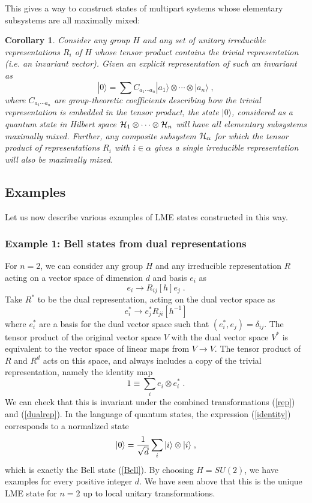 \documentclass[12pt]{article}
\newtheorem{corollary}[theorem]{Corollary}
\theoremstyle{definition}
\newcommand{\be}{\begin{equation}}
\newcommand{\ee}{\end{equation}}
\begin{document}
This gives a way to construct states of multipart systems whose elementary subsystems are all maximally mixed:
\begin{corollary}
Consider any group $H$ and any set of unitary irreducible representations $R_i$ of $H$ whose tensor product contains the trivial representation (i.e. an invariant vector). Given an explicit representation of such an invariant as
\be
\label{genstates}
|0 \rangle = \sum C_{a_1 \cdots a_n} |a_1 \rangle \otimes \cdots \otimes | a_n \rangle \; ,
\ee
where $C_{a_1 \cdots a_n}$ are group-theoretic coefficients describing how the trivial representation is embedded in the tensor product, the state $|0 \rangle$, considered as a quantum state in Hilbert space ${\cal H}_1 \otimes \cdots \otimes {\cal H}_n $ will have all elementary subsystems maximally mixed. Further, any composite subsystem ${\cal H}_{\alpha}$ for which the tensor product of representations $R_i$ with $i \in \alpha$ gives a single irreducible representation will also be maximally mixed.
\end{corollary}

\subsection{Examples}

Let us now describe various examples of LME states constructed in this way.

\subsubsection*{Example 1:  Bell states from dual representations}

For $n=2$, we can consider any group $H$ and any irreducible representation $R$ acting on a vector space of dimension $d$ and basis $e_i$ as
\be
\label{rep}
e_i \to R_{ij}[h] e_j \; .
\ee
Take $R^*$ to be the dual representation, acting on the dual vector space as
\be
\label{dualrep}
e^*_i \to  e^*_j R_{ji}[h^{-1}]
\ee
where $e^*_i$ are a basis for the dual vector space such that $(e^*_i, e_j) = \delta_{ij}$. The tensor product of the original vector space $V$ with the dual vector space $V^*$ is equivalent to the vector space of linear maps from $V \to V$. The tensor product of $R$ and $R^d$ acts on this space, and always includes a copy of the trivial representation, namely the identity map
\be
\label{identity}
1 \equiv \sum_i e_i \otimes e_i^* \; .
\ee
We can check that this is invariant under the combined transformations (\ref{rep}) and (\ref{dualrep}). In the language of quantum states, the expression (\ref{identity}) corresponds to a normalized state
\be
|0 \rangle = {1 \over \sqrt{d}} \sum_i |i \rangle \otimes |i \rangle \; ,
\ee
which is exactly the Bell state (\ref{Bell}). By choosing $H = SU(2)$, we have examples for every positive integer $d$. We have seen above that this is the unique LME state for $n=2$ up to local unitary transformations.
\end{document}
